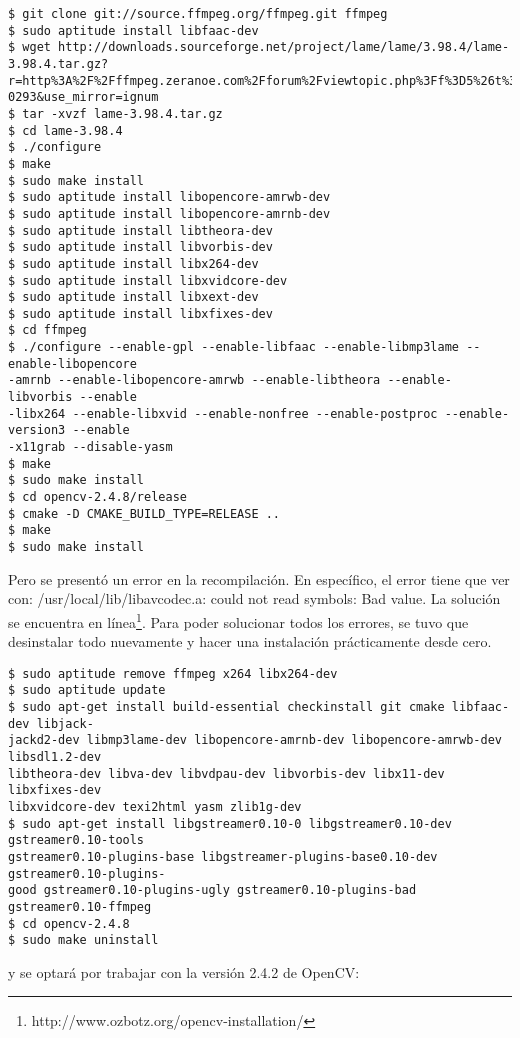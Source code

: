 \documentclass[letter]{article}
\begin{document}
\begin{lstlisting}
$ git clone git://source.ffmpeg.org/ffmpeg.git ffmpeg
$ sudo aptitude install libfaac-dev
$ wget http://downloads.sourceforge.net/project/lame/lame/3.98.4/lame-3.98.4.tar.gz?
r=http%3A%2F%2Fffmpeg.zeranoe.com%2Fforum%2Fviewtopic.php%3Ff%3D5%26t%3D94&ts=133914
0293&use_mirror=ignum
$ tar -xvzf lame-3.98.4.tar.gz
$ cd lame-3.98.4
$ ./configure
$ make
$ sudo make install
$ sudo aptitude install libopencore-amrwb-dev
$ sudo aptitude install libopencore-amrnb-dev
$ sudo aptitude install libtheora-dev
$ sudo aptitude install libvorbis-dev
$ sudo aptitude install libx264-dev
$ sudo aptitude install libxvidcore-dev
$ sudo aptitude install libxext-dev
$ sudo aptitude install libxfixes-dev
$ cd ffmpeg
$ ./configure --enable-gpl --enable-libfaac --enable-libmp3lame --enable-libopencore
-amrnb --enable-libopencore-amrwb --enable-libtheora --enable-libvorbis --enable
-libx264 --enable-libxvid --enable-nonfree --enable-postproc --enable-version3 --enable
-x11grab --disable-yasm
$ make
$ sudo make install
$ cd opencv-2.4.8/release
$ cmake -D CMAKE_BUILD_TYPE=RELEASE ..
$ make
$ sudo make install
\end{lstlisting}

Pero se presentó un error en la recompilación. En específico, el error tiene que ver con: /usr/local/lib/libavcodec.a: could not read symbols: Bad value. La solución se encuentra en línea\footnote{http://www.ozbotz.org/opencv-installation/}. Para poder solucionar todos los errores, se tuvo que desinstalar todo nuevamente y hacer una instalación prácticamente desde cero.

\begin{lstlisting}
$ sudo aptitude remove ffmpeg x264 libx264-dev
$ sudo aptitude update
$ sudo apt-get install build-essential checkinstall git cmake libfaac-dev libjack-
jackd2-dev libmp3lame-dev libopencore-amrnb-dev libopencore-amrwb-dev libsdl1.2-dev 
libtheora-dev libva-dev libvdpau-dev libvorbis-dev libx11-dev libxfixes-dev
libxvidcore-dev texi2html yasm zlib1g-dev
$ sudo apt-get install libgstreamer0.10-0 libgstreamer0.10-dev gstreamer0.10-tools
gstreamer0.10-plugins-base libgstreamer-plugins-base0.10-dev gstreamer0.10-plugins-
good gstreamer0.10-plugins-ugly gstreamer0.10-plugins-bad gstreamer0.10-ffmpeg
$ cd opencv-2.4.8
$ sudo make uninstall
\end{lstlisting}

y se optará por trabajar con la versión 2.4.2 de OpenCV:
\end{document}
